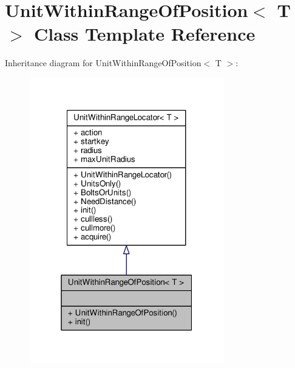 \hypertarget{classUnitWithinRangeOfPosition}{}\section{Unit\+Within\+Range\+Of\+Position$<$ T $>$ Class Template Reference}
\label{classUnitWithinRangeOfPosition}


Inheritance diagram for Unit\+Within\+Range\+Of\+Position$<$ T $>$\+:
\nopagebreak
\begin{figure}[H]
\begin{center}
\leavevmode
\includegraphics[width=241pt]{dd/d9e/classUnitWithinRangeOfPosition__inherit__graph}
\end{center}
\end{figure}


